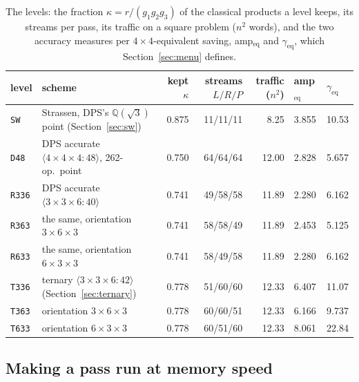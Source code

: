 \documentclass[11pt]{article}
\newcommand{\mm}[1]{\langle #1\rangle}
\newcommand{\lv}[1]{\texttt{#1}}
\begin{document}
\begin{table}[!htb]
\centering\footnotesize
\begin{tabular}{llrrrll}
\toprule
level & scheme & kept $\kappa$ & streams $L/R/P$ & traffic ($n^2$) & amp$_{\text{eq}}$ & $\gamma_{\text{eq}}$\\
\midrule
\lv{SW} & Strassen, DPS's $\mathbb{Q}(\sqrt3)$ point (Section~\ref{sec:sw}) & 0.875 & 11/11/11 & 8.25 & 3.855 & 10.53\\
\lv{D48} & DPS accurate $\mm{4\times4\times4:48}$, 262-op.\ point & 0.750 & 64/64/64 & 12.00 & 2.828 & 5.657\\
\lv{R336} & DPS accurate $\mm{3\times3\times6:40}$ & 0.741 & 49/58/58 & 11.89 & 2.280 & 6.162\\
\lv{R363} & the same, orientation $3\times6\times3$ & 0.741 & 58/58/49 & 11.89 & 2.453 & 5.125\\
\lv{R633} & the same, orientation $6\times3\times3$ & 0.741 & 58/49/58 & 11.89 & 2.280 & 6.162\\
\midrule
\lv{T336} & ternary $\mm{3\times3\times6:42}$ (Section~\ref{sec:ternary}) & 0.778 & 51/60/60 & 12.33 & 6.407 & 11.07\\
\lv{T363} & orientation $3\times6\times3$ & 0.778 & 60/60/51 & 12.33 & 6.166 & 9.737\\
\lv{T633} & orientation $6\times3\times3$ & 0.778 & 60/51/60 & 12.33 & 8.061 & 22.84\\
\bottomrule
\end{tabular}
\caption{The levels: the fraction $\kappa=r/(g_1g_2g_3)$ of the classical products a level keeps, its streams per pass, its traffic on a square problem
($n^2$ words), and the two accuracy measures per $4\times4$-equivalent
saving, amp$_{\text{eq}}$ and $\gamma_{\text{eq}}$, which Section~\ref{sec:menu} defines.}
\label{tab:levels}
\end{table}

\subsection{Making a pass run at memory speed}\label{sec:passspeed}
\end{document}
